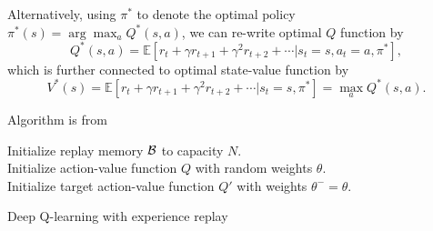 \begin{refsection}
Alternatively, using $\pi^*$ to denote the optimal policy $\pi^*(s) = \arg\max_{a} Q^*(s, a)$, we can re-write optimal $Q$ function by
$$Q^*(s, a) = \mathbb{E}\left[r_{t}+\gamma r_{t+1}+\gamma^{2} r_{t+2}+\cdots | s_{t}=s, a_{t}=a, \pi^*\right],$$
which is further connected to optimal state-value function by
$$V^*(s) = \mathbb{E}\left[r_{t}+\gamma r_{t+1}+\gamma^{2} r_{t+2}+\cdots | s_{t}=s, \pi^*\right] = \max_{a} Q^*(s, a).$$



Algorithm is from \cite{mnih2015human}

\begin{algorithm}

	Initialize replay memory $\mathcal{B}$ to capacity $N$.\\
	Initialize action-value function $Q$ with random weights $\theta$.\\
	Initialize target action-value function $Q'$ with weights $\theta^- = \theta$. \\
	\caption{Deep Q-learning with experience replay}
\end{algorithm}


\end{refsection}
